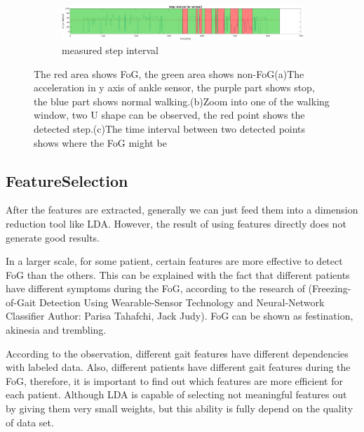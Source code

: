 \documentclass[article]{article}
\begin{document}
\begin{figure}
	
	\begin{subfigure}[b]{1\textwidth}
		\centering
		\includegraphics[width=\textwidth]{step_interval_fast_s2_p2}
		\caption{measured step interval}
		\label{fig:five over x}
	\end{subfigure}
	
	
	
	\caption{The red area shows FoG, the green area shows non-FoG(a)The acceleration in y axis of ankle sensor, the purple part shows stop, the blue part shows normal walking.(b)Zoom into one of the walking window, two U shape can be observed, the red point shows the detected step.(c)The time interval between two detected points shows where the FoG might be}
	\label{fig:three graphs}
\end{figure}

	


\begin{center}
	\subsection{FeatureSelection}
\end{center}

After the features are extracted, generally we can just feed them into a dimension reduction tool like LDA. However, the result of using features directly does not generate good results.

In a larger scale, for some patient, certain features are more effective to detect FoG than the others. This can be explained with the fact that different patients have different symptoms during the FoG, according to the research of (Freezing-of-Gait Detection Using Wearable-Sensor Technology and Neural-Network Classifier
Author: Parisa Tahafchi, Jack Judy). FoG can be shown as festination, akinesia and trembling.

According to the observation, different gait features have different dependencies with labeled data. Also, different patients have different gait features during the FoG, therefore, it is important to find out which features are more efficient for each patient. Although LDA is capable of selecting not meaningful features out by giving them very small weights, but this ability is fully depend on the quality of data set.
\end{document}
